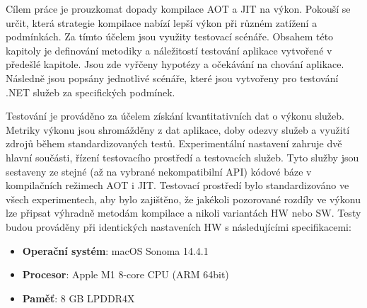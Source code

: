 


Cílem práce je prouzkomat dopady kompilace AOT a JIT na výkon. Pokouší se určit, která strategie kompilace nabízí lepší výkon při různém zatížení a podmínkách. Za tímto účelem jsou využity testovací scénáře. Obsahem této kapitoly je definování metodiky a náležitostí testování aplikace vytvořené v předešlé kapitole. Jsou zde vyřčeny hypotézy a očekávání na chování aplikace. Následně jsou popsány jednotlivé scénáře, které jsou vytvořeny pro testování .NET služeb za specifických podmínek.


Testování je prováděno za účelem získání kvantitativních dat o výkonu služeb. Metriky výkonu jsou shromážděny z dat aplikace, doby odezvy služeb a využití zdrojů během standardizovaných testů. Experimentální nastavení zahruje dvě hlavní součásti, řízení testovacího prostředí a testovacích služeb. Tyto služby jsou sestaveny ze stejné (až na vybrané nekompatibilní API) kódové báze v kompilačních režimech AOT i JIT. Testovací prostředí bylo standardizováno ve všech experimentech, aby bylo zajištěno, že jakékoli pozorované rozdíly ve výkonu lze připsat výhradně metodám kompilace a nikoli variantách HW nebo SW. Testy budou prováděny při identických nastaveních HW s následujícími specifikacemi:

\begin{itemize}
    \item \textbf{Operační systém}: macOS Sonoma 14.4.1
    \item \textbf{Procesor}: Apple M1 8-core CPU (ARM 64bit)
    \item \textbf{Paměť}: 8 GB LPDDR4X
\end{itemize}

